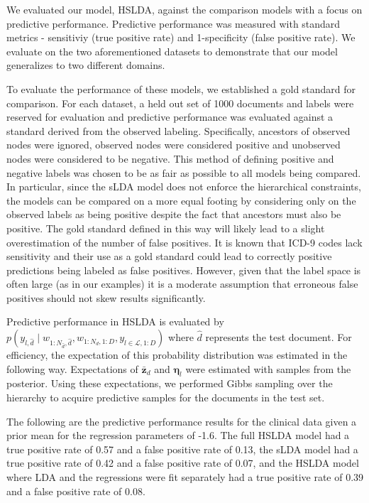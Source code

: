 We evaluated our model, HSLDA, against the comparison models with a focus
on predictive performance. Predictive performance was measured with
standard metrics - sensitiviy (true positive rate) and 
1-specificity (false positive rate). We evaluate on the two aforementioned
datasets to demonstrate that our model generalizes to two different
domains.

To evaluate the performance of these models, we established a gold standard for comparison.
For each dataset, a held out set of 1000 documents and labels were
reserved for evaluation and predictive performance was evaluated against a standard derived
from the observed labeling. Specifically, ancestors of observed nodes were ignored, observed nodes 
were considered positive and unobserved nodes were considered to be negative. This method of 
defining positive and negative labels was chosen to be as fair as possible to all models
being compared.  In particular, since the sLDA model does not enforce the hierarchical
constraints, the models can be compared on a more equal footing by considering only on the observed labels
as being positive despite the fact that ancestors must also be positive. The gold standard 
defined in this way will likely lead to a slight overestimation of the number of
false positives. It is known that ICD-9 codes lack sensitivity and their use as a
gold standard could lead to correctly positive predictions being labeled as false positives.
However, given that the label space is often large (as in our examples) it is a moderate assumption that
erroneous false positives should not skew results significantly.

Predictive performance in HSLDA is evaluated by $p\left(y_{l,\hat{d}}\mid w_{1:N_{\hat{d}},\hat{d}}, w_{1:N_d,1:D},  y_{l\in\mathcal{L},1:D}\right)$ 
where $\hat{d}$ represents the test document. For efficiency,
the expectation of this probability distribution was estimated in the following way. Expectations
of $\mathbf{\bar{z}}_d$ and $\boldsymbol{\eta}_l$ were estimated with samples from the posterior.
Using these expectations, we performed Gibbs sampling over the hierarchy to acquire predictive
samples for the documents in the test set.

The following are the predictive performance results for the clinical
data given a prior mean for the regression parameters of -1.6. 
The full HSLDA model had a true positive rate of 0.57 
and a false positive rate of 0.13, the sLDA model had a true positive
rate of 0.42 and a false positive rate of 0.07, and the HSLDA model where
LDA and the regressions were fit separately had a true positive rate of 0.39
and a false positive rate of 0.08.

